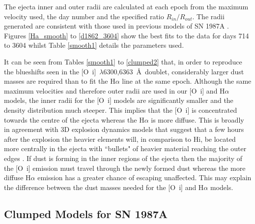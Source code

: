 \documentclass[useAMS,usenatbib,usegraphicx]{mnras}
\begin{document}
The ejecta inner and outer radii are calculated at each epoch from the maximum 
velocity used, the day number and the specified ratio $R_{in}/R_{out}$.  
The radii generated are consistent with those used in previous models of 
SN 1987A \citep{Ercolano2007, Wesson2015}.  Figures \ref{Ha_smooth} to 
\ref{d1862_3604} show the best fits to the data for days 714 to 3604 whilst 
Table \ref{smooth1} details the parameters used.

It can be seen from Tables \ref{smooth1} to \ref{clumped2} that, in order to reproduce the blueshifts seen in the 
[O~{\sc i}]~$\lambda$6300,6363~\AA\ doublet, considerably larger dust masses 
are required than to fit the H$\alpha$ line at the same epoch.  Although the same maximum velocities and therefore outer radii are used in our [O~{\sc i}] and H$\alpha$ models, the inner radii for the [O~{\sc i}] models are significantly smaller and the density distribution much steeper.  This implies that the [O~{\sc i}] is concentrated towards the centre of the ejecta whereas the H$\alpha$ is more diffuse.  This is broadly in agreement with 3D explosion dynamics models that suggest that a few hours after the explosion the heavier elements will, in comparison to H{\sc i}, be located more centrally in the ejecta with ``bullets" of heavier material reaching the outer edges  \citep{Hammer2010}.  If dust is forming in the inner regions of the ejecta then the majority of the  [O~{\sc i}] emission must travel through the newly formed dust whereas the more diffuse H$\alpha$ emission has a greater chance of escaping unaffected.  This may explain the difference between the dust masses needed for the [O~{\sc i}] and H$\alpha$ models.




\subsection{Clumped Models for SN 1987A}
\label{clumped_models}
\end{document}
